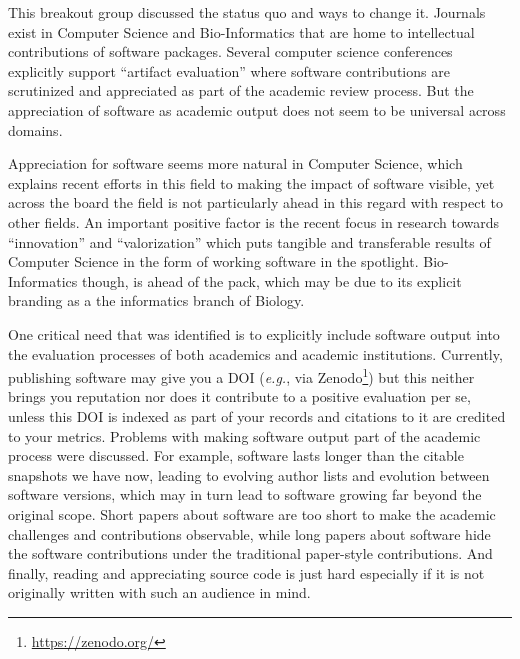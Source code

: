 \documentclass[a4paper,UKenglish]{dagrep}
\newcommand{\eg}{\emph{e.g.},\xspace}
\begin{document}
This breakout group discussed the status quo and ways to change it. Journals exist in Computer Science and Bio-Informatics that are home to intellectual contributions of software packages. Several computer science conferences explicitly support ``artifact evaluation'' where software contributions are scrutinized and appreciated as part of the academic review process. But the appreciation of software as academic output does not seem to be universal across domains.

Appreciation for software seems more natural in Computer Science, which explains recent efforts in this field to making the impact of software visible, yet across the board the field is not particularly ahead in this regard with respect to other fields. An important positive factor is the recent focus in research towards ``innovation'' and ``valorization'' which puts tangible and transferable results of Computer Science in the form of working software in the spotlight. Bio-Informatics though, is ahead of the pack, which may be due to its explicit branding as a the informatics branch of Biology.

One critical need that was identified is to explicitly include software output into the evaluation processes of both academics and academic institutions. Currently, publishing software may give you a DOI (\eg via Zenodo\footnote{\url{https://zenodo.org/}}) but this neither brings you reputation nor does it contribute to a positive evaluation per se, unless this DOI is indexed as part of your records and citations to it are credited to your metrics.
Problems with making software output part of the academic process were discussed. For example, software lasts longer than the citable snapshots we have now, leading to evolving author lists and evolution between software versions, which may in turn lead to software growing far beyond the original scope. Short papers about software are too short to make the academic challenges and contributions observable, while long papers about software hide the software contributions under the traditional paper-style contributions. And finally, reading and appreciating source code is just hard especially if it is not originally written with such an audience in mind.
\end{document}
